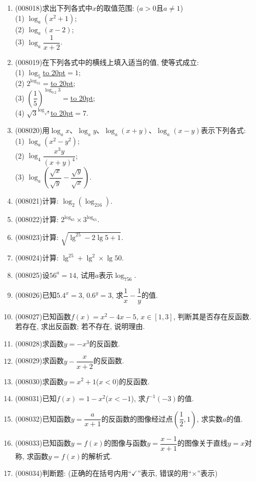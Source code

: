 \documentclass[10pt,a4paper]{article}
\newcommand{\blank}[1]{\underline{\hbox to #1pt{}}}
\begin{document}
\begin{enumerate}[1.]
\item {\tiny (008018)}求出下列各式中$x$的取值范围: ($a>0$且$a\ne 1$)\\
(1) $\log _a(x^2+1)$;\\
(2) $\log _a(x-2)$;\\
(3) $\log _a\dfrac 1{x+2}$.
\item {\tiny (008019)}在下列各式中的横线上填入适当的值, 使等式成立:\\
(1) $\log _5$\blank{20}$=1$;\\
(2) $2^{\log _31}=$\blank{20};\\
(3) $(\dfrac 15)^{\log _{0.2}3}=$\blank{20};\\
(4) $\sqrt 3^{\log _{\sqrt 3}}$\blank{20}$=7$.
\item {\tiny (008020)}用$\log _ax$、$\log _ay$、$\log _a(x+y)$、$\log _a(x-y)$表示下列各式:\\
(1) $\log _a(x^2-y^2)$;\\
(2) $\log _4\dfrac{x^3y}{(x+y)^4}$;\\
(3) $\log _a(\dfrac{\sqrt x}{\sqrt y}-\dfrac{\sqrt y}{\sqrt x})$.
\item {\tiny (008021)}计算: $\log _2(\log _216)$.
\item {\tiny (008022)}计算: $2^{\log _65}\times 3^{\log _65}$.
\item {\tiny (008023)}计算: $\sqrt {\lg^25-2\lg 5+1}$.
\item {\tiny (008024)}计算: $\lg ^25+\lg ^2\times \lg 50$.
\item {\tiny (008025)}设$56^a=14$, 试用$a$表示$\log _756$.
\item {\tiny (008026)}已知$5.4^x=3$, $0.6^y=3$, 求$\dfrac 1x-\dfrac 1y$的值.
\item {\tiny (008027)}已知函数$f(x)=x^2-4x-5$, $x\in [1,3]$, 判断其是否存在反函数. 若存在, 求出反函数; 若不存在, 说明理由.
\item {\tiny (008028)}求函数$y=-x^3$的反函数.
\item {\tiny (008029)}求函数$y-\dfrac x{x+2}$的反函数.
\item {\tiny (008030)}求函数$y=x^2+1$($x<0$)的反函数.
\item {\tiny (008031)}已知$f(x)=1-x^2$($x<-1$), 求$f^{-1}(-3)$的值.
\item {\tiny (008032)}已知函数$y=\dfrac a{x+1}$的反函数的图像经过点$(\dfrac 12,1)$, 求实数$a$的值.
\item {\tiny (008033)}已知函数$y=f(x)$的图像与函数$y=\dfrac{x-1}{x+1}$的图像关于直线$y=x$对称, 求函数$y=f(x)$的解析式.
\item {\tiny (008034)}判断题: (正确的在括号内用``$\checkmark$''表示, 错误的用``$\times$''表示)\\

\end{enumerate}
\end{document}
